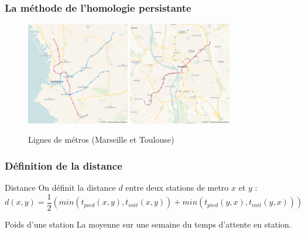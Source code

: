 \documentclass{beamer}
\begin{document}
\begin{frame}
    \frametitle{La méthode de l'homologie persistante}

    \begin{figure}
        \includegraphics[width=0.4\textwidth]{../images/marseille_blank.png}
        \hfill
        \includegraphics[width=0.4\textwidth]{../images/toulouse_blank.png}
        \centering
        \caption{Lignes de métros (Marseille et Toulouse)}
    \end{figure}

\end{frame}

\begin{frame}
    \frametitle{Définition de la distance}
    
    \begin{block}{Distance}
        On définit la distance $d$ entre deux stations de metro $x$ et $y$ : 
        $$ d(x,y) = \frac{1}{2}(min(t_{pied}(x,y), t_{voit}(x,y)) + min(t_{pied}(y,x), t_{voit}(y,x)))$$
    \end{block}

    \begin{block}{Poids d'une station}
        La moyenne sur une semaine du temps d'attente en station.
    \end{block}
\end{frame}
\end{document}
